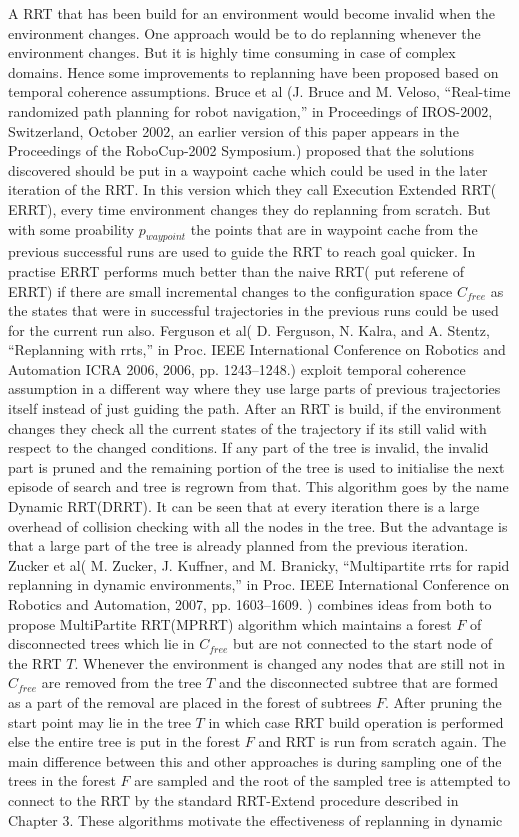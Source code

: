 \documentclass[MTech]{iitmdiss}
\begin{document}
A RRT that has been build for an environment would become invalid when the environment changes. One approach would be to do replanning whenever the environment changes. But it is highly time consuming in case of complex domains. Hence some improvements to replanning have been proposed based on temporal coherence assumptions. Bruce et al (J. Bruce and M. Veloso, “Real-time randomized path planning for robot navigation,” in Proceedings of IROS-2002, Switzerland, October 2002, an earlier version of this paper appears in the Proceedings of the RoboCup-2002 Symposium.) proposed that the solutions discovered should be put in a waypoint cache which could be used in the later iteration of the RRT. In this version which they call Execution Extended RRT( ERRT), every time environment changes they do replanning from scratch. But with some proability $p_{waypoint}$ the points that are in waypoint cache from the previous successful runs are used to guide the RRT to reach goal quicker. In practise ERRT performs much better than the naive RRT( put referene of ERRT) if there are small incremental changes to the configuration space $C_{free}$ as the states that were in successful trajectories in the previous runs could be used for the current run also. Ferguson et al(  D. Ferguson, N. Kalra, and A. Stentz, “Replanning with rrts,” in Proc. IEEE International Conference on Robotics and Automation ICRA 2006, 2006, pp. 1243–1248.) exploit temporal coherence assumption in a different way where they use large parts of previous trajectories itself instead of just guiding the path. After an RRT is build, if the environment changes they check all the current states of the trajectory if its still valid with respect to the changed conditions. If any part of the tree is invalid, the invalid part is pruned and the remaining portion of the tree is used to initialise the next episode of search and tree is regrown from that. This algorithm goes by the name Dynamic RRT(DRRT). It can be seen that at every iteration there is a large overhead of collision checking with all the nodes in the tree. But the advantage is that a large part of the tree is already planned from the previous iteration.  Zucker et al(  M. Zucker, J. Kuffner, and M. Branicky, “Multipartite rrts for rapid replanning in dynamic environments,” in Proc. IEEE International Conference on Robotics and Automation, 2007, pp. 1603–1609. ) combines ideas from both to propose MultiPartite RRT(MPRRT) algorithm which maintains a forest $F$ of disconnected trees which lie in $C_{free}$ but are not connected to the start node of the RRT $T$. Whenever the environment is changed any nodes that are still not in $C_{free}$ are removed from the tree $T$ and the disconnected subtree that are formed as a part of the removal are placed in the forest of subtrees $F$. After pruning the start point may lie in the tree $T$ in which case RRT build operation is performed else the entire tree is put in the forest $F$ and RRT is run from scratch again. The main difference between this and other approaches is during sampling one of the trees in the forest $F$ are sampled and the root of the sampled tree is attempted to connect to the RRT by the standard RRT-Extend procedure described in Chapter 3. These algorithms motivate the effectiveness of replanning in dynamic 
\end{document}
